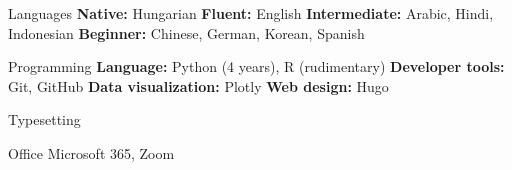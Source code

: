 
\begin{cvskills}
   

  \cvskill
    {Languages}
    {\textbf{Native:} Hungarian \textbf{Fluent:} English \textbf{Intermediate:} Arabic, Hindi, Indonesian \textbf{Beginner:} Chinese, German, Korean, Spanish} %
    
  \cvskill
    {Programming}
    {\textbf{Language:} Python (4 years), R (rudimentary) \textbf{Developer tools:} Git, GitHub \textbf{Data visualization:} Plotly \textbf{Web design:} Hugo} %

  \cvskill
    {Typesetting}
    {\textrm{}}

  \cvskill
    {Office}
    {Microsoft 365, Zoom}
\end{cvskills}
